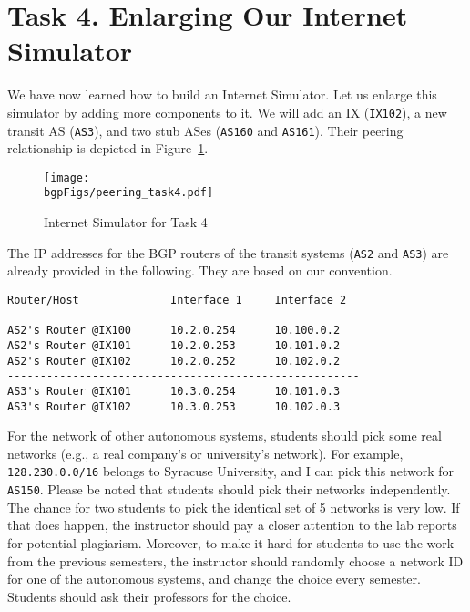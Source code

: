 \section{Task 4. Enlarging Our Internet Simulator} 

We have now learned how to build an Internet Simulator. Let
us enlarge this simulator by adding more components to it. 
We will add an IX (\texttt{IX102}),  
a new transit AS (\texttt{AS3}), and two stub 
ASes (\texttt{AS160} and \texttt{AS161}). Their peering 
relationship is depicted in Figure~\ref{bgp:fig:peering4}.    

\begin{figure}[htb]
    \begin{center}
    \texttt{[image: \\bgpFigs/peering\_task4.pdf]}
    \end{center}
    \caption{Internet Simulator for Task 4}
    \label{bgp:fig:peering4}
\end{figure}

The IP addresses for the BGP routers of the transit 
systems (\texttt{AS2} and \texttt{AS3}) are already
provided in the following. They are based on our convention. 

\begin{lstlisting}
Router/Host              Interface 1     Interface 2
------------------------------------------------------
AS2's Router @IX100      10.2.0.254      10.100.0.2
AS2's Router @IX101      10.2.0.253      10.101.0.2
AS2's Router @IX102      10.2.0.252      10.102.0.2
------------------------------------------------------
AS3's Router @IX101      10.3.0.254      10.101.0.3
AS3's Router @IX102      10.3.0.253      10.102.0.3
\end{lstlisting}


For the network of other autonomous systems, students should 
pick some real networks (e.g., a real company's or university's network).
For example, \texttt{128.230.0.0/16} belongs to Syracuse University,
and I can pick this network for \texttt{AS150}.  Please be noted
that students should pick their networks independently.
The chance for two students to pick the identical set of 5 networks is 
very low. If that does happen, the instructor should pay a closer attention
to the lab reports for potential plagiarism. Moreover, to make it hard
for students to use the work from the previous semesters, the instructor
should randomly choose a network ID for one of the autonomous systems, 
and change the choice every semester. Students should ask their 
professors for the choice. 


